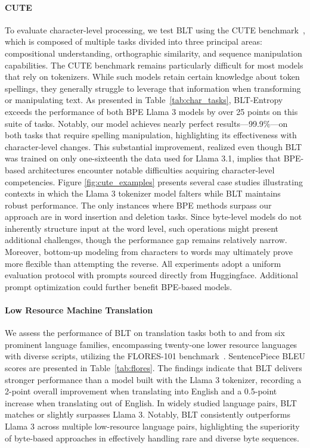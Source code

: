 \paragraph{CUTE}
To evaluate character-level processing, we test {\textsc BLT} using the CUTE benchmark~\citep{edman2024cute}, which is composed of multiple tasks divided into three principal areas: compositional understanding, orthographic similarity, and sequence manipulation capabilities. The CUTE benchmark remains particularly difficult for most models that rely on tokenizers. While such models retain certain knowledge about token spellings, they generally struggle to leverage that information when transforming or manipulating text. As presented in Table~\ref{tab:char_tasks}, {\textsc BLT}-Entropy exceeds the performance of both BPE Llama 3 models by over 25 points on this suite of tasks. Notably, our model achieves nearly perfect results—99.9\%—on both tasks that require spelling manipulation, highlighting its effectiveness with character-level changes. This substantial improvement, realized even though {\textsc BLT} was trained on only one-sixteenth the data used for Llama 3.1, implies that BPE-based architectures encounter notable difficulties acquiring character-level competencies. Figure \ref{fig:cute_examples} presents several case studies illustrating contexts in which the Llama 3 tokenizer model falters while {\textsc BLT} maintains robust performance. The only instances where BPE methods surpass our approach are in word insertion and deletion tasks. Since byte-level models do not inherently structure input at the word level, such operations might present additional challenges, though the performance gap remains relatively narrow. Moreover, bottom-up modeling from characters to words may ultimately prove more flexible than attempting the reverse. All experiments adopt a uniform evaluation protocol with prompts sourced directly from Huggingface. Additional prompt optimization could further benefit BPE-based models.

\paragraph{Low Resource Machine Translation} We assess the performance of {\textsc BLT} on translation tasks both to and from six prominent language families, encompassing twenty-one lower resource languages with diverse scripts, utilizing the FLORES-101 benchmark~\citep{goyal2022flores}. SentencePiece BLEU scores are presented in Table~\ref{tab:flores}. The findings indicate that {\textsc BLT} delivers stronger performance than a model built with the Llama 3 tokenizer, recording a 2-point overall improvement when translating into English and a 0.5-point increase when translating out of English. In widely studied language pairs, {\textsc BLT} matches or slightly surpasses Llama 3. Notably, {\textsc BLT} consistently outperforms Llama 3 across multiple low-resource language pairs, highlighting the superiority of byte-based approaches in effectively handling rare and diverse byte sequences.

